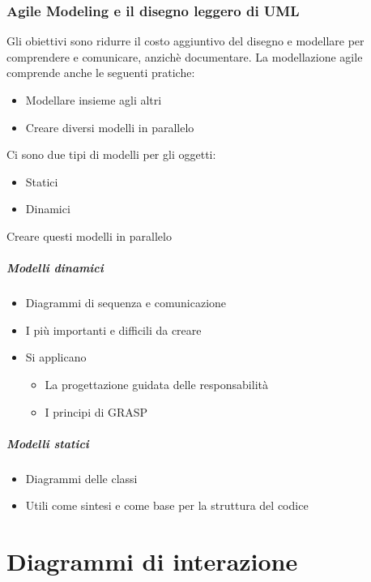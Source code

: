 \subsection*{Agile Modeling e il disegno leggero di UML}
Gli obiettivi sono ridurre il costo aggiuntivo del disegno e modellare per comprendere
e comunicare, anzichè documentare. La modellazione agile comprende anche le seguenti
pratiche:
\begin{itemize}
    \item Modellare insieme agli altri
    \item Creare diversi modelli in parallelo
\end{itemize}
Ci sono due tipi di modelli per gli oggetti:
\begin{itemize}
    \item Statici
    \item Dinamici
\end{itemize}
Creare questi modelli in parallelo
\paragraph*{Modelli dinamici}
\begin{itemize}
    \item Diagrammi di sequenza e comunicazione
    \item I più importanti e difficili da creare
    \item Si applicano \begin{itemize}
        \item La progettazione guidata delle responsabilità
        \item I principi di GRASP
    \end{itemize}
\end{itemize}
\paragraph*{Modelli statici}
\begin{itemize}
    \item Diagrammi delle classi
    \item Utili come sintesi e come base per la struttura del codice
\end{itemize}

\chapter{Diagrammi di interazione}
